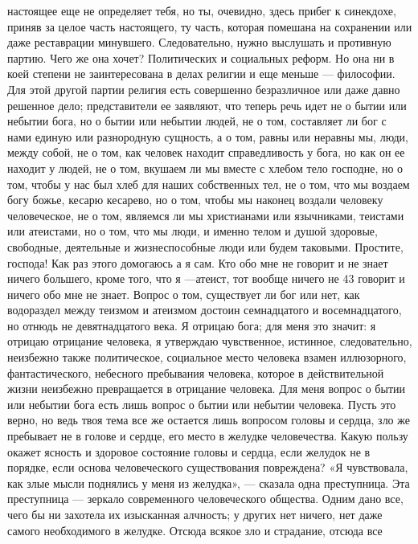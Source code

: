 \documentclass[12pt]{article}
\begin{document}
настоящее еще не определяет тебя, но ты, очевидно, здесь  
прибег к синекдохе, приняв за целое часть настоящего, ту 
часть, которая помешана на сохранении или даже  
реставрации минувшего. Следовательно, нужно выслушать 
и противную партию. Чего же она хочет? Политических 
и социальных реформ. Но она ни в коей степени не 
заинтересована в делах религии и еще меньше —  
философии. Для этой другой партии религия есть  
совершенно безразличное или даже давно решенное дело; 
представители ее заявляют, что теперь речь идет не о 
бытии или небытии бога, но о бытии или небытии  
людей, не о том, составляет ли бог с нами единую или 
разнородную сущность, а о том, равны или неравны мы, 
люди, между собой, не о том, как человек находит  
справедливость у бога, но как он ее находит у людей, не о 
том, вкушаем ли мы вместе с хлебом тело господне, но 
о том, чтобы у нас был хлеб для наших собственных 
тел, не о том, что мы воздаем богу божье, кесарю  
кесарево, но о том, чтобы мы наконец воздали человеку  
человеческое, не о том, являемся ли мы христианами или 
язычниками, теистами или атеистами, но о том, что мы 
люди, и именно телом и душой здоровые, свободные, 
деятельные и жизнеспособные люди или будем  
таковыми. Простите, господа! Как раз этого домогаюсь а я 
сам. Кто обо мне не говорит и не знает ничего  
большего, кроме того, что я —атеист, тот вообще ничего не 
43 
говорит и ничего обо мне не знает. Вопрос о том,  
существует ли бог или нет, как водораздел между теизмом и 
атеизмом достоин семнадцатого и восемнадцатого, но 
отнюдь не девятнадцатого века. Я отрицаю бога; для 
меня это значит: я отрицаю отрицание человека, я  
утверждаю чувственное, истинное, следовательно,  
неизбежно также политическое, социальное место человека 
взамен иллюзорного, фантастического, небесного  
пребывания человека, которое в действительной жизни  
неизбежно превращается в отрицание человека. Для меня 
вопрос о бытии или небытии бога есть лишь вопрос о 
бытии или небытии человека. 
Пусть это верно, но ведь твоя тема все же остается 
лишь вопросом головы и сердца, зло же пребывает не 
в голове и сердце, его место в желудке человечества. 
Какую пользу окажет ясность и здоровое состояние  
головы и сердца, если желудок не в порядке, если основа 
человеческого существования повреждена? «Я  
чувствовала, как злые мысли поднялись у меня из  
желудка», — сказала одна преступница. Эта преступница — 
зеркало современного человеческого общества. Одним 
дано все, чего бы ни захотела их изысканная алчность; 
у других нет ничего, нет даже самого необходимого в 
желудке. Отсюда всякое зло и страдание, отсюда все 
\end{document}
